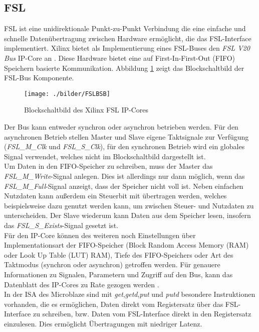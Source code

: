 \subsection{FSL}
FSL ist eine unidirektionale Punkt-zu-Punkt Verbindung die eine einfache und schnelle Datenübertragung zwischen Hardware ermöglicht, die das FSL-Interface implementiert. Xilinx bietet als Implementierung eines FSL-Buses den \textit{FSL V20 Bus} IP-Core an \cite{FSL_CORE}. Diese Hardware bietet eine auf First-In-First-Out (FIFO) Speichern basierte Kommunikation. Abbildung \ref{fig:FSLBSB} zeigt das Blockschaltbild der FSL-Bus Komponente.\\
\begin{figure}[th!]
\centering
\texttt{[image: ./bilder/FSLBSB]}
\caption{Blockschaltbild des Xilinx FSL IP-Cores \cite{FSL_CORE}}
\label{fig:FSLBSB}
\end{figure}
\noindent
Der Bus kann entweder synchron oder asynchron betrieben werden. Für den asynchronen Betrieb stellen Master und Slave eigene Taktsignale zur Verfügung (\textit{FSL\_M\_Clk} und \textit{FSL\_S\_Clk}), für den synchronen Betrieb wird ein globales Signal verwendet, welches nicht im Blockschaltbild dargestellt ist.\\
Um Daten in den FIFO-Speicher zu schreiben, muss der Master das \textit{FSL\_M\_Write}-Signal anlegen. Dies ist allerdings nur dann möglich, wenn das \textit{FSL\_M\_Full}-Signal anzeigt, dass der Speicher nicht voll ist. Neben einfachen Nutzdaten kann außerdem ein Steuerbit mit übertragen werden, welches beispielsweise dazu genutzt werden kann, um zwischen Steuer- und Nutzdaten zu unterscheiden. Der Slave wiederum kann Daten aus dem Speicher lesen, insofern das \textit{FSL\_S\_Exists}-Signal gesetzt ist.\\
Für den IP-Core können des weiteren noch Einstellungen über Implementationsart der FIFO-Speicher (Block Random Access Memory (RAM) oder Look Up Table (LUT) RAM), Tiefe des FIFO-Speichers oder Art des Taktmodus (synchron oder asynchron) getroffen werden. Für genauere Informationen zu Signalen, Parametern und Zugriff auf den Bus, kann das Datenblatt des IP-Cores zu Rate gezogen werden \cite{FSL_CORE}.\\
In der ISA des Microblaze sind mit \textit{get},\textit{getd},\textit{put} und \textit{putd} besondere Instruktionen vorhanden, die es ermöglichen, Daten direkt vom Registersatz über das FSL-Interface zu schreiben, bzw. Daten vom FSL-Interface direkt in den Registersatz einzulesen. Dies ermöglicht Übertragungen mit niedriger Latenz.
